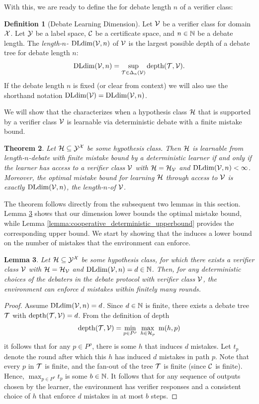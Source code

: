 \documentclass[11pt,letterpaper]{article}
\newtheorem{theorem}{Theorem}
\newtheorem{lemma}[theorem]{Lemma}
\theoremstyle{definition}
\newtheorem{definition}[theorem]{Definition}
\theoremstyle{plain}
\begin{document}
With this, we are ready to define the \emph{\debatedimname} for debate length $n$ of a verifier class:
\begin{definition}[Debate Learning Dimension]%
 Let ${\mathcal V}$ be a verifier class for domain ${\mathcal X}$. Let ${\mathcal Y}$ be a label space, ${{\mathcal C}}$ be a certificate space, and $n\in\mathbb{N}$ be a debate length. The \emph{length-$n$-\debatedimname} $\mathrm{DLdim}({\mathcal V}, n)$ of ${\mathcal V}$ is the largest possible depth of a debate tree for debate length $n$:
 \[
  \mathrm{DLdim}({\mathcal V}, n) = \sup_{{\mathcal T}\in\Delta_n({\mathcal V})} \mathrm{depth}({\mathcal T},{\mathcal V}).
 \]
If the debate length $n$ is fixed (or clear from context) we will also use the shorthand notation $\mathrm{DLdim}({\mathcal V}) =   \mathrm{DLdim}({\mathcal V}, n)$.
\end{definition}
We will show that the \debatedimname characterizes when a hypothesis class ${{\mathcal H}}$ that is supported by a verifier class ${\mathcal V}$ is learnable via deterministic debate with a finite mistake bound. 

\begin{theorem}
Let ${{\mathcal H}}\subseteq {\mathcal Y}^{\mathcal X}$ be some hypothesis class. Then ${{\mathcal H}}$ is learnable from length-$n$-debate with finite mistake bound by a deterministic learner if and only if the learner has access to a verifier class ${\mathcal V}$ with ${{\mathcal H}} = {{\mathcal H}}_{\mathcal V}$ and $\mathrm{DLdim}({\mathcal V}, n) <\infty$.
Moreover, the optimal mistake bound for learning ${{\mathcal H}}$ through access to ${\mathcal V}$ is exactly $\mathrm{DLdim}({\mathcal V}, n)$, the length-$n$-\debatedimname of ${\mathcal V}$.
\end{theorem}

The theorem follows directly from the subsequent two lemmas in this section. Lemma \ref{lemma:cooperative_deterministic_lowerbound} shows that our dimension lower bounds the optimal mistake bound, while Lemma \ref{lemma:cooperative_deterministic_upperbound} provides the corresponding upper bound.
We start by showing that the \debatedimname induces a lower bound on the number of mistakes that the environment can enforce.

\begin{lemma}\label{lemma:cooperative_deterministic_lowerbound}
Let ${{\mathcal H}}\subseteq {\mathcal Y}^{\mathcal X}$ be some hypothesis class, for which there exists a verifier class ${\mathcal V}$ with ${{\mathcal H}} = {{\mathcal H}}_{\mathcal V}$ and $\mathrm{DLdim}({\mathcal V}, n) = d \in \mathbb{N}$. Then, for any deterministic choices of the debaters in the debate protocol with verifier class ${\mathcal V}$, the environment can enforce $d$ mistakes within finitely many rounds.
\end{lemma}

\begin{proof}
Assume $\mathrm{DLdim}({\mathcal V}, n) = d$. 
Since $d\in\mathbb{N}$ is finite, there exists a debate tree ${\mathcal T}$ with $\mathrm{depth}({\mathcal T},{\mathcal V}) = d$. 
From the definition of depth
\[
\mathrm{depth}({\mathcal T},{\mathcal V}) =  \min_{p\in P^\rho}~  \max_{h\in {{\mathcal H}}_p}~ \mathrm{m}(h, p)
\]
it follows that for any $p \in P^\rho$, there is some $h$ that induces $d$ mistakes. Let $t_p$ denote the round after which this $h$ has induced $d$ mistakes in path $p$. Note that every $p$ in ${\mathcal T}$ is finite, and the fan-out of the tree ${\mathcal T}$ is finite (since ${{\mathcal C}}$ is finite). Hence, 
$\max_{p\in P^\rho} t_p$ is some $b \in \mathbb{N}$. 
It follows that for any sequence of outputs chosen by the learner, the environment has verifier responses and a consistent choice of $h$ that enforce $d$ mistakes in at most $b$ steps. 
\end{proof}
\end{document}
